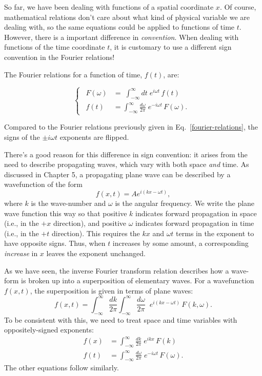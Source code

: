 \documentclass[10pt,a4paper]{article}
\begin{document}
So far, we have been dealing with functions of a spatial coordinate
$x$. Of course, mathematical relations don't care about what kind of
physical variable we are dealing with, so the same equations could be
applied to functions of time $t$. However, there is a important
difference in \emph{convention}. When dealing with functions of the time
coordinate $t$, it is customary to use a different sign convention in
the Fourier relations!

The Fourier relations for a function of time, $f(t)$, are:

\begin{framed}
\begin{equation}
\left\{\;\,\begin{aligned}F(\omega) &= \;\int_{-\infty}^\infty dt\; e^{i\omega t}\, f(t) \\ f(t) &= \int_{-\infty}^\infty \frac{d\omega}{2\pi}\; e^{-i\omega t}\, F(\omega).\end{aligned}\;\,\right.
\end{equation}
\end{framed}

\noindent
Compared to the Fourier relations previously given in
Eq.~\eqref{fourier-relations}, the signs of the $\pm i \omega t$
exponents are flipped.

There's a good reason for this difference in sign convention: it
arises from the need to describe propagating waves, which vary with
both space \emph{and} time. As discussed in Chapter 5, a propagating
plane wave can be described by a wavefunction of the form
\begin{equation}
f(x,t) = A e^{i(kx - \omega t)},
\end{equation}
where $k$ is the wave-number and $\omega$ is the angular frequency.
We write the plane wave function this way so that positive $k$
indicates forward propagation in space (i.e., in the $+x$ direction),
and positive $\omega$ indicates forward propagation in time (i.e., in
the $+t$ direction). This requires the $kx$ and $\omega t$ terms
in the exponent to have opposite signs. Thus, when $t$ increases by
some amount, a corresponding \emph{increase} in $x$ leaves the
exponent unchanged.

As we have seen, the inverse Fourier transform relation describes how a
wave-form is broken up into a superposition of elementary waves. For a
wavefunction $f(x,t)$, the superposition is given in terms of plane
waves:
\begin{equation}
f(x,t) = \int_{-\infty}^\infty \frac{dk}{2\pi} \int_{-\infty}^\infty \frac{d\omega}{2\pi}\;\; e^{i(kx-\omega t)}\, F(k,\omega).
\end{equation}
To be consistent with this, we need to treat space and time variables
with oppositely-signed exponents:
\begin{align}
  f(x) &= \int_{-\infty}^\infty \frac{dk}{2\pi}\; e^{ikx}\, F(k) \\
  f(t) &= \int_{-\infty}^\infty \frac{d\omega}{2\pi}\;
  e^{-i\omega t}\, F(\omega).
\end{align}
The other equations follow similarly.
\end{document}
